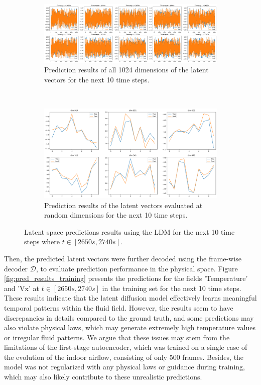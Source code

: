 \documentclass[final-report]{article-template}
\begin{document}
\begin{figure}[!htb]
    \centering
    \begin{subfigure}[t]{\textwidth}
        \centering
        \includegraphics[width=\textwidth]{figures/latent_results.png}
        \caption{Prediction results of all 1024 dimensions of the latent vectors for the next 10 time steps.}
    \end{subfigure} \\[8mm]
    \begin{subfigure}[t]{0.7\textwidth}
        \centering
        \includegraphics[width=\textwidth]{figures/latent_random_dim.png}
        \caption{Prediction results of the latent vectors evaluated at random dimensions for the next 10 time steps.}
    \end{subfigure} 
    \caption{Latent space predictions results using the LDM for the next 10 time steps where $t \in [2650s, 2740s]$.}
    \label{fig:preds_latent}
\end{figure}

Then, the predicted latent vectors were further decoded using the frame-wise decoder $\mathcal{D}$, to evaluate prediction performance in the physical space. Figure \ref{fig:pred_results_training} presents the predictions for the fields 'Temperature' and 'Vx' at $t \in [2650s, 2740s]$ in the training set for the next 10 time steps. These results indicate that the latent diffusion model effectively learns meaningful temporal patterns within the fluid field. However, the results seem to have discrepancies in details compared to the ground truth, and some predictions may also violate physical laws, which may generate extremely high temperature values or irregular fluid patterns. We argue that these issues may stem from the limitations of the first-stage autoencoder, which was trained on a single case of the evolution of the indoor airflow, consisting of only 500 frames. Besides, the model was not regularized with any physical laws or guidance during training, which may also likely contribute to these unrealistic predictions. \\
\end{document}
